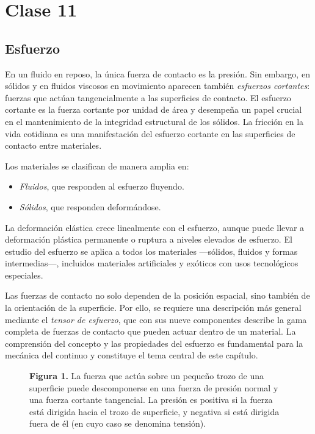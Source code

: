 \chapter{Clase 11}

\section{Esfuerzo}

En un fluido en reposo, la única fuerza de contacto es la presión. Sin embargo, en sólidos y en fluidos viscosos en movimiento aparecen también \emph{esfuerzos cortantes}: fuerzas que actúan tangencialmente a las superficies de contacto. El esfuerzo cortante es la fuerza cortante por unidad de área y desempeña un papel crucial en el mantenimiento de la integridad estructural de los sólidos. La fricción en la vida cotidiana es una manifestación del esfuerzo cortante en las superficies de contacto entre materiales.

Los materiales se clasifican de manera amplia en:
\begin{itemize}
\item \emph{Fluidos}, que responden al esfuerzo fluyendo.
\item \emph{Sólidos}, que responden deformándose.
\end{itemize}

La deformación elástica crece linealmente con el esfuerzo, aunque puede llevar a deformación plástica permanente o ruptura a niveles elevados de esfuerzo. El estudio del esfuerzo se aplica a todos los materiales —sólidos, fluidos y formas intermedias—, incluidos materiales artificiales y exóticos con usos tecnológicos especiales.

Las fuerzas de contacto no solo dependen de la posición espacial, sino también de la orientación de la superficie. Por ello, se requiere una descripción más general mediante el \emph{tensor de esfuerzo}, que con sus nueve componentes describe la gama completa de fuerzas de contacto que pueden actuar dentro de un material. La comprensión del concepto y las propiedades del esfuerzo es fundamental para la mecánica del continuo y constituye el tema central de este capítulo.

\begin{figure}[H]
\centering

\par\medskip
\textbf{Figura 1.} La fuerza que actúa sobre un pequeño trozo de una superficie puede descomponerse en una fuerza de presión normal y una fuerza cortante tangencial. La presión es positiva si la fuerza está dirigida hacia el trozo de superficie, y negativa si está dirigida fuera de él (en cuyo caso se denomina tensión).
\end{figure}

